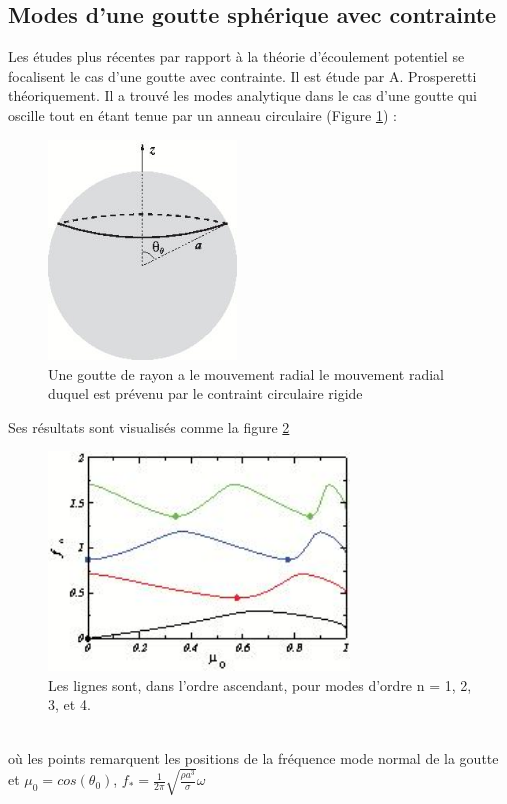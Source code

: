 \documentclass[a4paper]{report}
\begin{document}
\subsection{Modes d'une goutte sphérique avec contrainte}
Les études plus récentes par rapport à la théorie d'écoulement potentiel se focalisent le cas d'une goutte avec contrainte. Il est étude par A. Prosperetti \cite{4} théoriquement. Il a trouvé les modes analytique dans le cas d'une goutte qui oscille tout en étant tenue par un anneau circulaire (Figure \ref{prosperetti}) :
\begin{figure}[h!] 
\begin{center}
\includegraphics[width=5cm]{2_3_2_prosperetti}
\caption{Une goutte de rayon a le mouvement radial le mouvement radial duquel est prévenu par le contraint circulaire rigide}
\label{prosperetti}
\end{center}
\end{figure}
\newpage
Ses résultats sont visualisés comme la figure \ref{contrainte_Prosperetti}
\begin{figure}[h!] 
\begin{center}
\includegraphics[width=8cm]{2_3_2_contrainte_Prosperetti.jpeg}
\caption{Les lignes sont, dans l'ordre ascendant, pour modes d'ordre n = 1, 2, 3, et 4.}
\label{contrainte_Prosperetti}
\end{center}
\end{figure}
\\
où les points remarquent les positions de la fréquence mode normal de la goutte\\
et $\mu_0 = cos(\theta_0)$, $f_* = \frac{1}{2 \pi } \sqrt{\frac{\rho a^3}{\sigma}} \omega$
\end{document}
